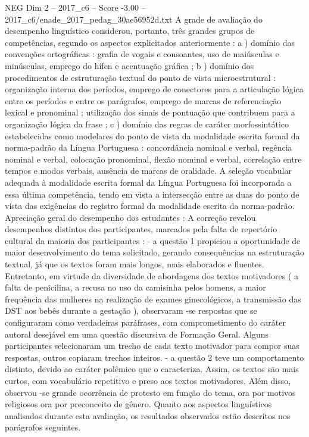 \begin{textsample}{NEG Dim 2 – 2017\_c6 – Score -3.00 – 2017\_c6/enade\_2017\_pedag\_30ae56952d.txt}
A grade de avaliação do desempenho linguístico considerou, portanto, três grandes grupos de competências, segundo os aspectos explicitados anteriormente : a ) domínio das convenções ortográficas : grafia de vogais e consoantes, uso de maiúsculas e minúsculas, emprego do hífen e acentuação gráfica ; b ) domínio dos procedimentos de estruturação textual do ponto de vista microestrutural : organização interna dos períodos, emprego de conectores para a articulação lógica entre os períodos e entre os parágrafos, emprego de marcas de referenciação lexical e pronominal ; utilização dos sinais de pontuação que contribuem para a organização lógica da frase ; c ) domínio das regras de caráter morfossintático estabelecidas como modelares do ponto de vista da modalidade escrita formal da norma-padrão da Língua Portuguesa : concordância nominal e verbal, regência nominal e verbal, colocação pronominal, flexão nominal e verbal, correlação entre tempos e modos verbais, ausência de marcas de oralidade.
A seleção vocabular adequada à modalidade escrita formal da Língua Portuguesa foi incorporada a essa última competência, tendo em vista a intersecção entre as duas do ponto de vista das exigências do registro formal da modalidade escrita da norma-padrão.
Apreciação geral do desempenho dos estudantes : A correção revelou desempenhos distintos dos participantes, marcados pela falta de repertório cultural da maioria dos participantes : - a questão 1 propiciou a oportunidade de maior desenvolvimento do tema solicitado, gerando consequências na estruturação textual, já que os textos foram mais longos, mais elaborados e fluentes.
Entretanto, em virtude da diversidade de abordagens dos textos motivadores ( a falta de penicilina, a recusa no uso da camisinha pelos homens, a maior frequência das mulheres na realização de exames ginecológicos, a transmissão das DST aos bebês durante a gestação ), observaram -se respostas que se configuraram como verdadeiras paráfrases, com comprometimento do caráter autoral desejável em uma questão discursiva de Formação Geral.
Alguns participantes selecionaram um trecho de cada texto motivador para compor suas respostas, outros copiaram trechos inteiros. - a questão 2 teve um comportamento distinto, devido ao caráter polêmico que o caracteriza.
Assim, os textos são mais curtos, com vocabulário repetitivo e preso aos textos motivadores.
Além disso, observou -se grande ocorrência de protesto em função do tema, ora por motivos religiosos ora por preconceito de gênero.
Quanto aos aspectos linguísticos analisados durante esta avaliação, os resultados observados estão descritos nos parágrafos seguintes.

\end{textsample}
